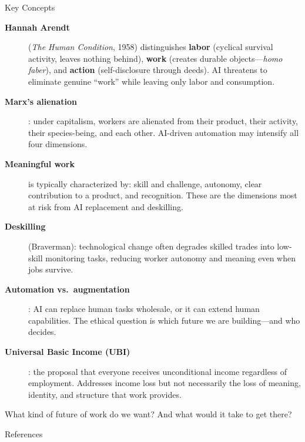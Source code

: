 ﻿\documentclass[aspectratio=169,11pt]{beamer}
\begin{document}
\begin{frame}[allowframebreaks]{Key Concepts}
\footnotesize
\begin{description}
    \item[\textbf{Hannah Arendt}] (\textit{The Human Condition}, 1958) distinguishes \textbf{labor} (cyclical survival activity, leaves nothing behind), \textbf{work} (creates durable objects---\textit{homo faber}), and \textbf{action} (self-disclosure through deeds). AI threatens to eliminate genuine ``work'' while leaving only labor and consumption.
    \item[\textbf{Marx's alienation}]: under capitalism, workers are alienated from their product, their activity, their species-being, and each other. AI-driven automation may intensify all four dimensions.
    \item[\textbf{Meaningful work}] is typically characterized by: skill and challenge, autonomy, clear contribution to a product, and recognition. These are the dimensions most at risk from AI replacement and deskilling.
    \item[\textbf{Deskilling}] (Braverman): technological change often degrades skilled trades into low-skill monitoring tasks, reducing worker autonomy and meaning even when jobs survive.
    \item[\textbf{Automation vs.\ augmentation}]: AI can replace human tasks wholesale, or it can extend human capabilities. The ethical question is which future we are building---and who decides.
    \item[\textbf{Universal Basic Income (UBI)}]: the proposal that everyone receives unconditional income regardless of employment. Addresses income loss but not necessarily the loss of meaning, identity, and structure that work provides.
\end{description}

\begin{discussionbox}[Discussion]
What kind of future of work do we want? And what would it take to get there?
\end{discussionbox}
\end{frame}

\begin{frame}[allowframebreaks]{References}
\printbibliography[heading=none]
\end{frame}
\end{document}
